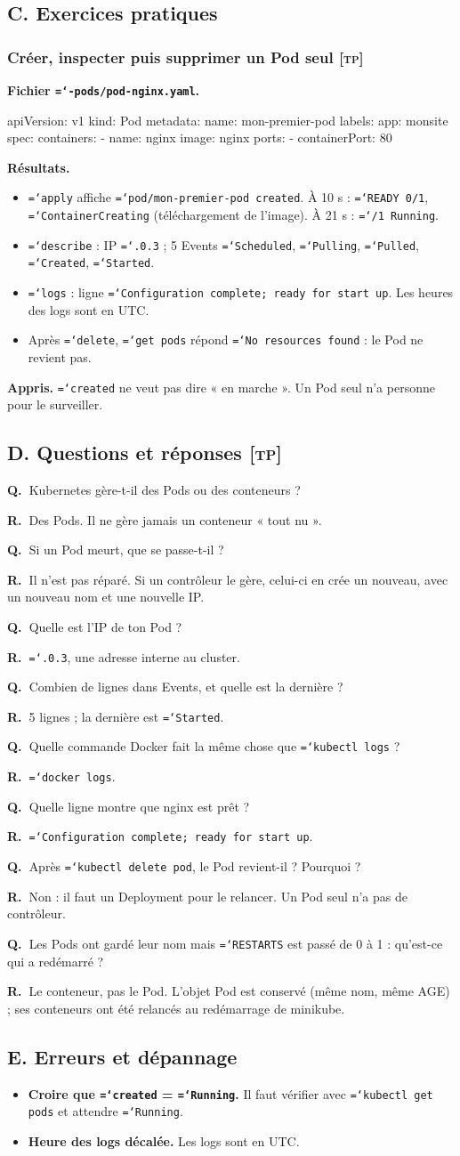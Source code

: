 \documentclass[11pt,a4paper]{article}
\newcommand{\cmd}[1]{\texttt{\hyphenchar\font=`\-#1}}
\newcommand{\tp}{\textsc{[tp]}}
\newcommand{\QR}[2]{\needspace{4\baselineskip}\par\noindent\textbf{Q.~}#1\par\nopagebreak\noindent\textbf{R.~}#2\par\medskip}
\newcommand{\partie}[1]{\needspace{9\baselineskip}\subsection*{#1}}
\newcommand{\exo}[1]{\needspace{8\baselineskip}\subsubsection*{#1}}
\begin{document}
\partie{C. Exercices pratiques}
\exo{Créer, inspecter puis supprimer un Pod seul \tp}
\textbf{Fichier \cmd{02-pods/pod-nginx.yaml}.}
\begin{code}
apiVersion: v1
kind: Pod
metadata:
  name: mon-premier-pod
  labels:
    app: monsite
spec:
  containers:
    - name: nginx
      image: nginx
      ports:
        - containerPort: 80
\end{code}
\textbf{Résultats.}
\begin{itemize}
  \item \cmd{apply} affiche \cmd{pod/mon-premier-pod created}. À 10 s : \cmd{READY 0/1}, \cmd{ContainerCreating} (téléchargement de l'image). À 21 s : \cmd{1/1 Running}.
  \item \cmd{describe} : IP \cmd{10.244.0.3} ; 5 Events \cmd{Scheduled}, \cmd{Pulling}, \cmd{Pulled}, \cmd{Created}, \cmd{Started}.
  \item \cmd{logs} : ligne \cmd{Configuration complete; ready for start up}. Les heures des logs sont en UTC.
  \item Après \cmd{delete}, \cmd{get pods} répond \cmd{No resources found} : le Pod ne revient pas.
\end{itemize}
\textbf{Appris.} \cmd{created} ne veut pas dire « en marche ». Un Pod seul n'a personne pour le surveiller.

\partie{D. Questions et réponses \tp}
\QR{Kubernetes gère-t-il des Pods ou des conteneurs ?}{Des Pods. Il ne gère jamais un conteneur « tout nu ».}
\QR{Si un Pod meurt, que se passe-t-il ?}{Il n'est pas réparé. Si un contrôleur le gère, celui-ci en crée un nouveau, avec un nouveau nom et une nouvelle IP.}
\QR{Quelle est l'IP de ton Pod ?}{\cmd{10.244.0.3}, une adresse interne au cluster.}
\QR{Combien de lignes dans Events, et quelle est la dernière ?}{5 lignes ; la dernière est \cmd{Started}.}
\QR{Quelle commande Docker fait la même chose que \cmd{kubectl logs} ?}{\cmd{docker logs}.}
\QR{Quelle ligne montre que nginx est prêt ?}{\cmd{Configuration complete; ready for start up}.}
\QR{Après \cmd{kubectl delete pod}, le Pod revient-il ? Pourquoi ?}{Non : il faut un Deployment pour le relancer. Un Pod seul n'a pas de contrôleur.}
\QR{Les Pods ont gardé leur nom mais \cmd{RESTARTS} est passé de 0 à 1 : qu'est-ce qui a redémarré ?}{Le conteneur, pas le Pod. L'objet Pod est conservé (même nom, même AGE) ; ses conteneurs ont été relancés au redémarrage de minikube.}

\partie{E. Erreurs et dépannage}
\begin{itemize}
  \item \textbf{Croire que \cmd{created} = \cmd{Running}.} Il faut vérifier avec \cmd{kubectl get pods} et attendre \cmd{Running}.
  \item \textbf{Heure des logs décalée.} Les logs sont en UTC.
\end{itemize}
\end{document}
